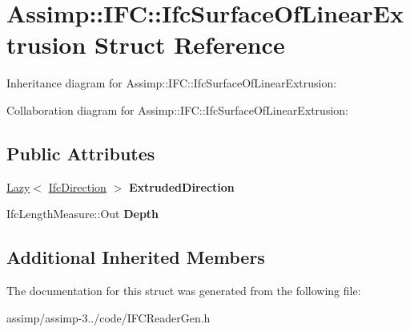 \hypertarget{struct_assimp_1_1_i_f_c_1_1_ifc_surface_of_linear_extrusion}{\section{Assimp\+:\+:I\+F\+C\+:\+:Ifc\+Surface\+Of\+Linear\+Extrusion Struct Reference}
\label{struct_assimp_1_1_i_f_c_1_1_ifc_surface_of_linear_extrusion}
}


Inheritance diagram for Assimp\+:\+:I\+F\+C\+:\+:Ifc\+Surface\+Of\+Linear\+Extrusion\+:


Collaboration diagram for Assimp\+:\+:I\+F\+C\+:\+:Ifc\+Surface\+Of\+Linear\+Extrusion\+:
\subsection*{Public Attributes}
\begin{DoxyCompactItemize}
\item 
\hypertarget{struct_assimp_1_1_i_f_c_1_1_ifc_surface_of_linear_extrusion_a8faac164c6c7c8303f4a19912c3871c2}{\hyperlink{struct_assimp_1_1_s_t_e_p_1_1_lazy}{Lazy}$<$ \hyperlink{struct_assimp_1_1_i_f_c_1_1_ifc_direction}{Ifc\+Direction} $>$ {\bfseries Extruded\+Direction}}\label{struct_assimp_1_1_i_f_c_1_1_ifc_surface_of_linear_extrusion_a8faac164c6c7c8303f4a19912c3871c2}

\item 
\hypertarget{struct_assimp_1_1_i_f_c_1_1_ifc_surface_of_linear_extrusion_a9ec1ba90378c840ccf738cc9d8a15a60}{Ifc\+Length\+Measure\+::\+Out {\bfseries Depth}}\label{struct_assimp_1_1_i_f_c_1_1_ifc_surface_of_linear_extrusion_a9ec1ba90378c840ccf738cc9d8a15a60}

\end{DoxyCompactItemize}
\subsection*{Additional Inherited Members}


The documentation for this struct was generated from the following file\+:\begin{DoxyCompactItemize}
\item 
assimp/assimp-\/3../code/I\+F\+C\+Reader\+Gen.\+h\end{DoxyCompactItemize}
